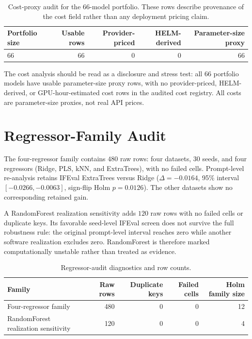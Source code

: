 \documentclass{article}
\begin{document}
\begin{table}[h]
  \caption{Cost-proxy audit for the 66-model portfolio. These rows describe provenance of the cost field rather than any deployment pricing claim.}
  \label{tab:app-cost-audit}
  \centering
  \scriptsize
  \begin{tabular}{lrrrr}
    \toprule
    Portfolio size & Usable rows & Provider-priced & HELM-derived & Parameter-size proxy \\
    \midrule
    66 & 66 & 0 & 0 & 66 \\
    \bottomrule
  \end{tabular}
\end{table}

The cost analysis should be read as a disclosure and stress test: all 66 portfolio models have usable parameter-size proxy rows, with no provider-priced, HELM-derived, or GPU-hour-estimated cost rows in the audited cost registry. All costs are parameter-size proxies, not real API prices.

\section{Regressor-Family Audit}
\label{app:regressor-family}

The four-regressor family contains $480$ raw rows: four datasets, 30 seeds, and four regressors (Ridge, PLS, kNN, and ExtraTrees), with no failed cells. Prompt-level re-analysis retains IFEval ExtraTrees versus Ridge ($\Delta=-0.0164$, 95\% interval $[-0.0266,-0.0063]$, sign-flip Holm $p=0.0126$). The other datasets show no corresponding retained gain.

A RandomForest realization sensitivity adds $120$ raw rows with no failed cells or duplicate keys. Its favorable seed-level IFEval screen does not survive the full robustness rule: the original prompt-level interval reaches zero while another software realization excludes zero. RandomForest is therefore marked computationally unstable rather than treated as evidence.

\begin{table}[h]
  \caption{Regressor-audit diagnostics and row counts.}
  \label{tab:app-regressor-diagnostics}
  \centering
  \scriptsize
  \begin{tabular}{lrrrr}
    \toprule
    Family & Raw rows & Duplicate keys & Failed cells & Holm family size \\
    \midrule
    Four-regressor family & 480 & 0 & 0 & 12 \\
    RandomForest realization sensitivity & 120 & 0 & 0 & 4 \\
    \bottomrule
  \end{tabular}
\end{table}
\end{document}
